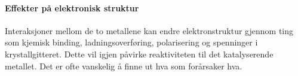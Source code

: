 \paragraph{Effekter på elektronisk struktur} Interaksjoner mellom de to metallene kan endre elektronstruktur gjennom ting som kjemisk binding, ladningsoverføring, polarisering og spenninger i krystallgitteret. Dette vil igjen påvirke reaktiviteten til det katalyserende metallet. Det er ofte vanskelig å finne ut hva som forårsaker hva.
